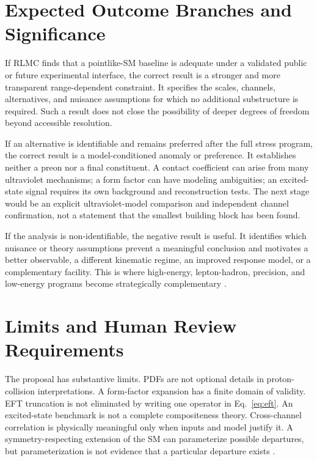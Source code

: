 \section{Expected Outcome Branches and Significance}

If RLMC finds that a pointlike-SM baseline is adequate under a validated public or future experimental interface, the correct result is a stronger and more transparent range-dependent constraint. It specifies the scales, channels, alternatives, and nuisance assumptions for which no additional substructure is required. Such a result does not close the possibility of deeper degrees of freedom beyond accessible resolution.

If an alternative is identifiable and remains preferred after the full stress program, the correct result is a model-conditioned anomaly or preference. It establishes neither a preon nor a final constituent. A contact coefficient can arise from many ultraviolet mechanisms; a form factor can have modeling ambiguities; an excited-state signal requires its own background and reconstruction tests. The next stage would be an explicit ultraviolet-model comparison and independent channel confirmation, not a statement that the smallest building block has been found.

If the analysis is non-identifiable, the negative result is useful. It identifies which nuisance or theory assumptions prevent a meaningful conclusion and motivates a better observable, a different kinematic regime, an improved response model, or a complementary facility. This is where high-energy, lepton-hadron, precision, and low-energy programs become strategically complementary \cite{abada2019,alekhin2016,jaeckel2010}.

\section{Limits and Human Review Requirements}

The proposal has substantive limits. PDFs are not optional details in proton-collision interpretations. A form-factor expansion has a finite domain of validity. EFT truncation is not eliminated by writing one operator in Eq.~\eqref{eq:eft}. An excited-state benchmark is not a complete compositeness theory. Cross-channel correlation is physically meaningful only when inputs and model justify it. A symmetry-respecting extension of the SM can parameterize possible departures, but parameterization is not evidence that a particular departure exists \cite{colladay1998}.

